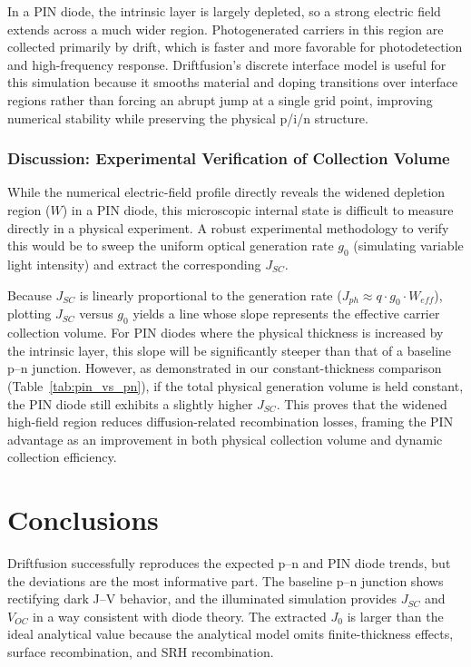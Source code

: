 \documentclass[11pt,a4paper]{article}
\newcommand{\jzero}{J_0}
\newcommand{\jsc}{J_{SC}}
\newcommand{\voc}{V_{OC}}
\begin{document}
In a PIN diode, the intrinsic layer is largely depleted, so a strong electric field extends across a much wider region. Photogenerated carriers in this region are collected primarily by drift, which is faster and more favorable for photodetection and high-frequency response. Driftfusion's discrete interface model is useful for this simulation because it smooths material and doping transitions over interface regions rather than forcing an abrupt jump at a single grid point, improving numerical stability while preserving the physical p/i/n structure.
\subsubsection{Discussion: Experimental Verification of Collection Volume}

While the numerical electric-field profile directly reveals the widened depletion region ($W$) in a PIN diode, this microscopic internal state is difficult to measure directly in a physical experiment. A robust experimental methodology to verify this would be to sweep the uniform optical generation rate $g_0$ (simulating variable light intensity) and extract the corresponding $\jsc$. 

Because $\jsc$ is linearly proportional to the generation rate ($J_{ph} \approx q \cdot g_0 \cdot W_{eff}$), plotting $\jsc$ versus $g_0$ yields a line whose slope represents the effective carrier collection volume. For PIN diodes where the physical thickness is increased by the intrinsic layer, this slope will be significantly steeper than that of a baseline p--n junction. However, as demonstrated in our constant-thickness comparison (Table~\ref{tab:pin_vs_pn}), if the total physical generation volume is held constant, the PIN diode still exhibits a slightly higher $\jsc$. This proves that the widened high-field region reduces diffusion-related recombination losses, framing the PIN advantage as an improvement in both physical collection volume and dynamic collection efficiency.
\section{Conclusions}

Driftfusion successfully reproduces the expected p--n and PIN diode trends, but the deviations are the most informative part. The baseline p--n junction shows rectifying dark J--V behavior, and the illuminated simulation provides $\jsc$ and $\voc$ in a way consistent with diode theory. The extracted $\jzero$ is larger than the ideal analytical value because the analytical model omits finite-thickness effects, surface recombination, and SRH recombination.
\end{document}
